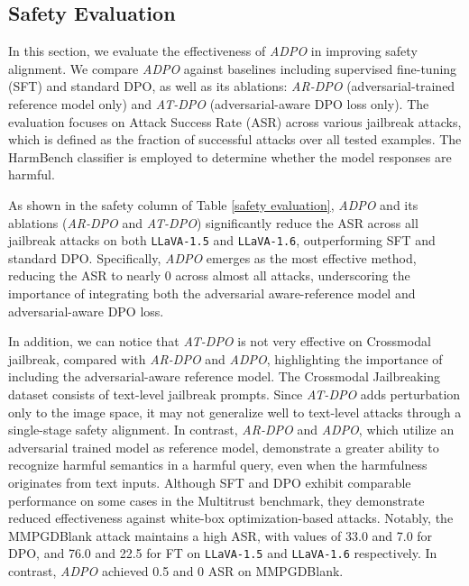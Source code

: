 \subsection{Safety Evaluation}
\vspace{-0.5em}
In this section, we evaluate the effectiveness of \textit{ADPO} in improving safety alignment. We compare \textit{ADPO} against baselines including supervised fine-tuning (SFT) and standard DPO, as well as its ablations: \textit{AR-DPO} (adversarial-trained reference model only) and \textit{AT-DPO} (adversarial-aware DPO loss only).  The evaluation focuses on Attack Success Rate (ASR) across various jailbreak attacks, which is defined as the fraction of successful attacks over all tested examples. The HarmBench classifier \cite{harmbench} is employed to determine whether the model responses are harmful. 

As shown in the safety column of Table \ref{safety evaluation},  \textit{ADPO} and its ablations (\textit{AR-DPO} and \textit{AT-DPO}) significantly reduce the ASR across all jailbreak attacks on both \texttt{LLaVA-1.5} and \texttt{LLaVA-1.6}, outperforming SFT and standard DPO.  Specifically, \textit{ADPO} emerges as the most effective method, reducing the ASR to nearly 0 across almost all attacks, underscoring the importance of integrating both the adversarial aware-reference model and adversarial-aware DPO loss.  

In addition, we can notice that \textit{AT-DPO} is not very effective on Crossmodal jailbreak, compared with \textit{AR-DPO} and \textit{ADPO}, highlighting the importance of including the adversarial-aware reference model. The Crossmodal Jailbreaking dataset consists of text-level jailbreak prompts. Since \textit{AT-DPO} adds perturbation only to the image space, it may not generalize well to text-level attacks through a single-stage safety alignment. In contrast, \textit{AR-DPO} and \textit{ADPO}, which utilize an adversarial trained model as reference model, demonstrate a greater ability to recognize harmful semantics in a harmful query, even when the harmfulness originates from text inputs. Although SFT and DPO exhibit comparable performance on some cases in the Multitrust benchmark, they demonstrate reduced effectiveness against white-box optimization-based attacks. Notably, the MMPGDBlank attack maintains a high ASR, with values of 33.0 and 7.0 for DPO, and 76.0 and 22.5 for FT on \texttt{LLaVA-1.5} and \texttt{LLaVA-1.6} respectively. In contrast, \textit{ADPO} achieved 0.5 and 0 ASR on MMPGDBlank. 




